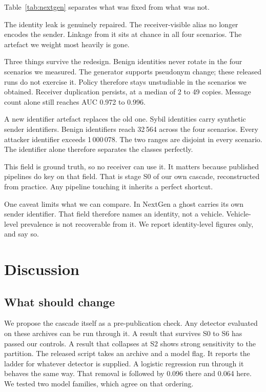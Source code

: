 \documentclass[conference]{IEEEtran}
\begin{document}
Table~\ref{tab:nextgen} separates what was fixed from what was not.

The identity leak is genuinely repaired.
The receiver-visible alias no longer encodes the sender.
Linkage from it sits at chance in all four scenarios.
The artefact we weight most heavily is gone.

Three things survive the redesign.
Benign identities never rotate in the four scenarios we measured.
The generator supports pseudonym change; these released runs do not exercise it.
Policy therefore stays unstudiable in the scenarios we obtained.
Receiver duplication persists, at a median of 2 to 49 copies.
Message count alone still reaches AUC 0.972 to 0.996.

A new identifier artefact replaces the old one.
Sybil identities carry synthetic sender identifiers.
Benign identifiers reach 32\,564 across the four scenarios.
Every attacker identifier exceeds 1\,000\,078.
The two ranges are disjoint in every scenario.
The identifier alone therefore separates the classes perfectly.

This field is ground truth, so no receiver can use it.
It matters because published pipelines do key on that field.
That is stage S0 of our own cascade, reconstructed from practice.
Any pipeline touching it inherits a perfect shortcut.

One caveat limits what we can compare.
In NextGen a ghost carries its own sender identifier.
That field therefore names an identity, not a vehicle.
Vehicle-level prevalence is not recoverable from it.
We report identity-level figures only, and say so.

\section{Discussion}

\subsection{What should change}

We propose the cascade itself as a pre-publication check.
Any detector evaluated on these archives can be run through it.
A result that survives S0 to S6 has passed our controls.
A result that collapses at S2 shows strong sensitivity to the partition.
The released script takes an archive and a model flag.
It reports the ladder for whatever detector is supplied.
A logistic regression run through it behaves the same way.
That removal is followed by 0.096 there and 0.064 here.
We tested two model families, which agree on that ordering.
\end{document}
